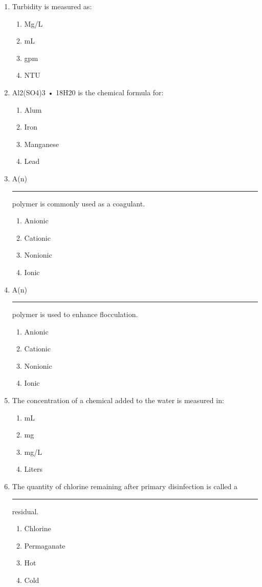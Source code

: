 \documentclass{article}
\begin{document}
\begin{enumerate}
\item Turbidity is measured as:
\begin{enumerate}
\item Mg/L
\item mL
\item gpm
\item NTU
\end{enumerate}

\item Al2(SO4)3 • 18H20 is the chemical formula for:
\begin{enumerate}
\item Alum
\item Iron
\item Manganese
\item Lead
\end{enumerate}

\item A(n) \rule{1cm}{0.5pt}  polymer is commonly used as a coagulant.
\begin{enumerate}
\item Anionic
\item Cationic
\item Nonionic
\item Ionic
\end{enumerate}

\item A(n) \rule{1cm}{0.5pt}  polymer is used to enhance flocculation.
\begin{enumerate}
\item Anionic
\item Cationic
\item Nonionic
\item Ionic
\end{enumerate}

\item The concentration of a chemical added to the water is measured in:
\begin{enumerate}
\item mL
\item mg
\item mg/L
\item Liters
\end{enumerate}

\item The quantity of chlorine remaining after primary disinfection is called a
\rule{1cm}{0.5pt}  residual.
\begin{enumerate}
\item Chlorine
\item Permaganate
\item Hot
\item Cold
\end{enumerate}


\end{enumerate}
\end{document}
